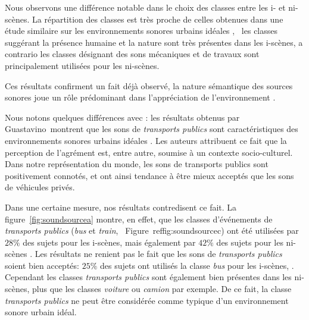 Nous observons une différence notable dans le choix des classes entre les i- et ni-scènes. La répartition des classes est très proche de celles obtenues dans une étude similaire sur les environnements sonores urbains idéales  \citep{guastavino2006ideal}, \ie~les classes suggérant la présence humaine et la nature sont très présentes dans les i-scènes, a contrario les classes désignant des sons mécaniques et de travaux sont principalement utilisées pour les ni-scènes.

Ces résultats confirment un fait déjà observé, la nature sémantique des sources sonores joue un rôle prédominant dans l'appréciation de l'environnement \citep{raimbault2005urban,dubois2006cognitive}.

Nous notons quelques différences avec \citep{guastavino2006ideal}: les résultats obtenus par Guastavino~\al montrent que les sons de \emph{transports publics} sont caractéristiques des environnements sonores urbains idéales . Les auteurs attribuent ce fait que  la perception de l'agrément est, entre autre, soumise à un contexte socio-culturel. Dans notre représentation du monde, les sons de transports publics sont positivement connotés, et ont ainsi tendance à être mieux acceptés que les sons de véhicules privés.

Dans une certaine mesure, nos résultats contredisent ce fait. La figure~\ref{fig:soundsourcea}  montre, en effet, que les classes d'événements de \emph{transports publics} (\emph{bus} et \emph{train}, \cf~Figure~ref{fig:soundsourcec}) ont été utilisées par $28\%$ des sujets pour les i-scènes, mais également  par $42\%$ des sujets pour les ni-scènes . Les résultats ne renient pas  le fait que  les sons de \emph{transports publics} soient bien acceptés: $25\%$ des sujets ont utilisés la classe \emph{bus} pour les i-scènes,  . Cependant les classes \emph{transports publics} sont également bien présentes dans les ni-scènes, plus que les classes \emph{voiture} ou \emph{camion} par exemple. De ce fait, la classe \emph{transports publics} ne peut être considérée  comme typique d'un environnement sonore urbain idéal.

